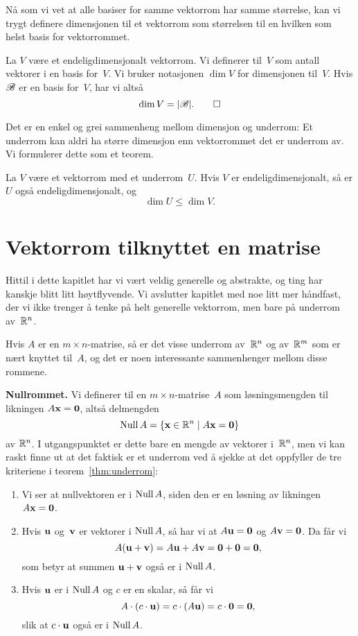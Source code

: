 Nå som vi vet at alle basiser for samme vektorrom har samme størrelse,
kan vi trygt definere dimensjonen til et vektorrom som størrelsen til
en hvilken som helst basis for vektorrommet.

\begin{defn}
La $V$ være et endeligdimensjonalt vektorrom.  Vi definerer
 til~$V$ som antall vektorer i en basis for~$V$.
Vi bruker notasjonen $\dim V$ for dimensjonen til~$V$.  Hvis $\mathscr{B}$ er
en basis for~$V$, har vi altså
\[
\dim V = |\mathscr{B}|.\qedhere
\]
\end{defn}


Det er en enkel og grei sammenheng mellom dimensjon og underrom: Et
underrom kan aldri ha større dimensjon enn vektorrommet det er
underrom av.  Vi formulerer dette som et teorem.

\begin{thm}
La $V$ være et vektorrom med et underrom~$U$.  Hvis $V$ er
endeligdimensjonalt, så er $U$ også endeligdimensjonalt, og
\[
\dim U \le \dim V.
\]
\end{thm}



\section*{Vektorrom tilknyttet en matrise}

Hittil i dette kapitlet har vi vært veldig generelle og abstrakte, og
ting har kanskje blitt litt høytflyvende.  Vi avslutter kapitlet med
noe litt mer håndfast, der vi ikke trenger å tenke på helt generelle
vektorrom, men bare på underrom av~$\mathbb{R}^n$.

Hvis $A$ er en $m \times n$-matrise, så er det visse underrom
av~$\mathbb{R}^n$ og av~$\mathbb{R}^m$ som er nært knyttet til~$A$, og det er noen
interessante sammenhenger mellom disse rommene.

\medskip\noindent\textbf{Nullrommet. }%
Vi definerer  til en $m \times n$-matrise~$A$ som
løsningsmengden til likningen $A \mathbf{x} = \mathbf{0}$, altså delmengden
\[
\operatorname{Null} A = \{ \mathbf{x} \in \mathbb{R}^n \mid A \mathbf{x} = \mathbf{0} \}
\]
av $\mathbb{R}^n$.  I utgangspunktet er dette bare en mengde av vektorer
i~$\mathbb{R}^n$, men vi kan raskt finne ut at det faktisk er et underrom ved
å sjekke at det oppfyller de tre kriteriene i teorem~\ref{thm:underrom}:
\begin{enumerate}
\item Vi ser at nullvektoren er i $\operatorname{Null} A$, siden den er en løsning
av likningen $A \mathbf{x} = \mathbf{0}$.
\item Hvis $\mathbf{u}$ og~$\mathbf{v}$ er vektorer i $\operatorname{Null} A$, så har vi at
$A \mathbf{u} = \mathbf{0}$ og $A \mathbf{v} = \mathbf{0}$.  Da får vi
\[
A (\mathbf{u} + \mathbf{v}) = A \mathbf{u} + A \mathbf{v} = \mathbf{0} + \mathbf{0} = \mathbf{0},
\]
som betyr at summen $\mathbf{u} + \mathbf{v}$ også er i $\operatorname{Null} A$.
\item Hvis $\mathbf{u}$ er i $\operatorname{Null} A$ og $c$ er en skalar, så får vi
\[
A \cdot (c \cdot \mathbf{u}) = c \cdot (A \mathbf{u}) = c \cdot \mathbf{0} = \mathbf{0},
\]
slik at $c \cdot \mathbf{u}$ også er i $\operatorname{Null} A$.
\end{enumerate}

